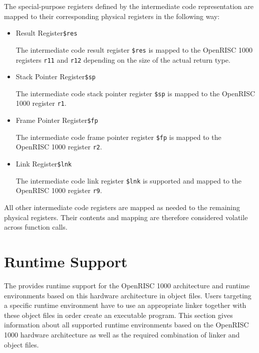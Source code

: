 The special-purpose registers defined by the intermediate code representation are mapped to their corresponding physical registers in the following way:

\begin{itemize}

\item Result Register\alignright\texttt{\$res}\nopagebreak

The intermediate code result register \texttt{\$res} is mapped to the OpenRISC 1000 registers \texttt{r11} and \texttt{r12} depending on the size of the actual return type.

\item Stack Pointer Register\alignright\texttt{\$sp}\nopagebreak

The intermediate code stack pointer register \texttt{\$sp} is mapped to the OpenRISC 1000 register \texttt{r1}.

\item Frame Pointer Register\alignright\texttt{\$fp}\nopagebreak

The intermediate code frame pointer register \texttt{\$fp} is mapped to the OpenRISC 1000 register \texttt{r2}.

\item Link Register\alignright\texttt{\$lnk}\nopagebreak

The intermediate code link register \texttt{\$lnk} is supported and mapped to the OpenRISC 1000 register \texttt{r9}.

\end{itemize}

All other intermediate code registers are mapped as needed to the remaining physical registers.
Their contents and mapping are therefore considered volatile across function calls.

\section{Runtime Support}

The \ecs{} provides runtime support for the OpenRISC 1000 architecture and runtime environments based on this hardware architecture in object files.
Users targeting a specific runtime environment have to use an appropriate linker together with these object files in order create an executable program.
This section gives information about all supported runtime environments based on the OpenRISC 1000 hardware architecture as well as the required combination of linker and object files.

